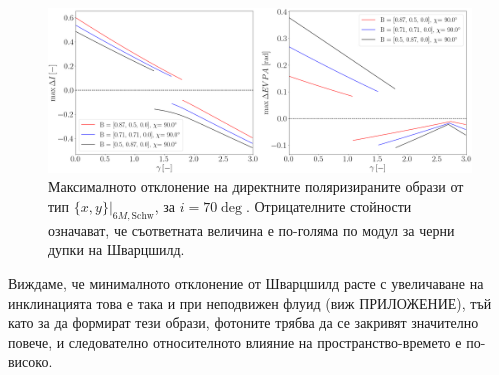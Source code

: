 \begin{figure}[!htb]
	\centering
	\includegraphics[scale = 0.22]{WH_70_deg_param_sweep.png}
	\caption[Максималното отклонение на директните поляризираните образи от тип $\{x,y\}\vert_{6M, \text{Schw}}$, за $i = 70\deg$]{Максималното отклонение на директните поляризираните образи от тип $\{x,y\}\vert_{6M, \text{Schw}}$, за $i = 70\deg$. Отрицателните стойности означават, че съответната величина е по-голяма по модул за черни дупки на Шварцшилд.} 
	\label{WH_max_deviation_70_deg}
\end{figure}

Виждаме, че минималното отклонение от Шварцшилд расте с увеличаване на инклинацията това е така и при неподвижен флуид (виж ПРИЛОЖЕНИЕ), тъй като за да формират тези образи, фотоните трябва да се закривят значително повече, и следователно относителното влияние на пространство-времето е по-високо.

